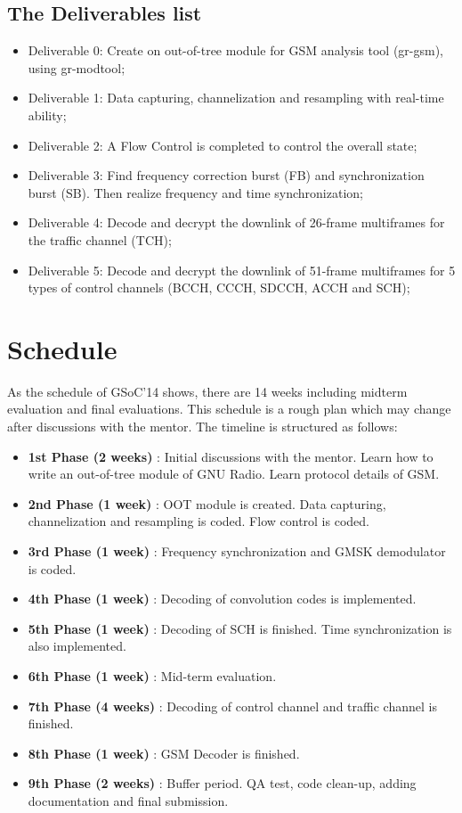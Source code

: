 \documentclass[a4paper,12pt,oneside]{article}
\begin{document}
\subsection{The Deliverables list}
\begin{itemize}
\item Deliverable 0: Create on out-of-tree module for GSM analysis tool (gr-gsm), using gr-modtool;
\item Deliverable 1: Data capturing, channelization and resampling with real-time ability;
\item Deliverable 2: A Flow Control is completed to control the overall state;
\item Deliverable 3: Find frequency correction burst (FB) and synchronization burst (SB). Then realize frequency and time synchronization;
\item Deliverable 4: Decode and decrypt the downlink of 26-frame multiframes for the traffic channel (TCH);
\item Deliverable 5: Decode and decrypt the downlink of 51-frame multiframes for 5 types of control channels (BCCH, CCCH, SDCCH, ACCH and SCH);
\end{itemize}

\section{Schedule}
As the schedule of GSoC'14 shows, there are 14 weeks including midterm evaluation and final evaluations. This schedule is a rough plan which may change after discussions with the mentor. The timeline is structured as follows:
\begin{itemize}
\item \textbf{1st Phase (2 weeks)} : Initial discussions with the mentor. Learn how to write an out-of-tree module of GNU Radio. Learn protocol details of GSM.
\item \textbf{2nd Phase (1 week)} : OOT module is created. Data capturing, channelization and resampling is coded. Flow control is coded.
\item \textbf{3rd Phase (1 week)} : Frequency synchronization and GMSK demodulator is coded.
\item \textbf{4th Phase (1 week)} : Decoding of convolution codes is implemented.
\item \textbf{5th Phase (1 week)} : Decoding of SCH is finished. Time synchronization is also implemented.
\item \textbf{6th Phase (1 week)} : Mid-term evaluation.
\item \textbf{7th Phase (4 weeks)} : Decoding of control channel and traffic channel is finished.
\item \textbf{8th Phase (1 week)} : GSM Decoder is finished.
\item \textbf{9th Phase (2 weeks)} : Buffer period. QA test, code clean-up, adding documentation and final submission.

\end{itemize}
\end{document}
